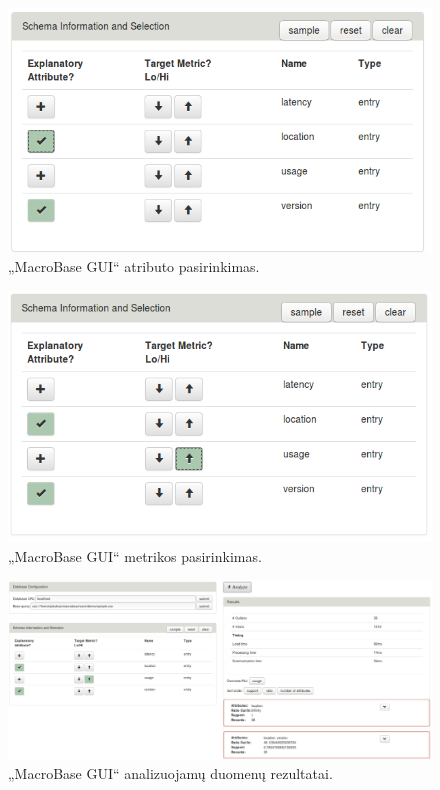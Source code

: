 \documentclass{VUMIFPSkursinis}
\begin{document}
\begin{figure}[H]
    \centering
    \includegraphics[scale=0.5]{img/atributes}
    \caption{„MacroBase GUI“ atributo pasirinkimas.}
    \label{img:atributes}
\end{figure}

\begin{figure}[H]
    \centering
    \includegraphics[scale=0.5]{img/metrics}
    \caption{„MacroBase GUI“ metrikos pasirinkimas.}
    \label{img:metrics}
\end{figure}

\begin{figure}[H]
    \centering
    \includegraphics[scale=0.25]{img/analyze}
    \caption{„MacroBase GUI“ analizuojamų duomenų rezultatai.}
    \label{img:analyze}
\end{figure}
\end{document}
